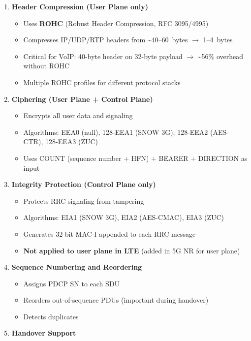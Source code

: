 \begin{enumerate}
\def\labelenumi{\arabic{enumi}.}
\tightlist
\item
  \textbf{Header Compression (User Plane only)}

  \begin{itemize}
  \tightlist
  \item
    Uses \textbf{ROHC} (Robust Header Compression, RFC 3095/\allowbreak{}4995)
  \item
    Compresses IP/\allowbreak{}UDP/\allowbreak{}RTP headers from \textasciitilde{}40–60~bytes \ensuremath{\to} 1–4~bytes
  \item
    Critical for VoIP: 40-byte header on 32-byte payload \ensuremath{\to} \textasciitilde{}56\% overhead without ROHC
  \item
    Multiple ROHC profiles for different protocol stacks
  \end{itemize}
\item
  \textbf{Ciphering (User Plane + Control Plane)}

  \begin{itemize}
  \tightlist
  \item
    Encrypts all user data and signaling
  \item
    Algorithms: EEA0 (null), 128-EEA1 (SNOW 3G), 128-EEA2 (AES-CTR), 128-EEA3 (ZUC)
  \item
    Uses COUNT (sequence number + HFN) + BEARER + DIRECTION as input
  \end{itemize}
\item
  \textbf{Integrity Protection (Control Plane only)}

  \begin{itemize}
  \tightlist
  \item
    Protects RRC signaling from tampering
  \item
    Algorithms: EIA1 (SNOW 3G), EIA2 (AES-CMAC), EIA3 (ZUC)
  \item
    Generates 32-bit MAC-I appended to each RRC message
  \item
    \textbf{Not applied to user plane in LTE} (added in 5G NR for user plane)
  \end{itemize}
\item
  \textbf{Sequence Numbering and Reordering}

  \begin{itemize}
  \tightlist
  \item
    Assigns PDCP SN to each SDU
  \item
    Reorders out-of-sequence PDUs (important during handover)
  \item
    Detects duplicates
  \end{itemize}
\item
  \textbf{Handover Support}


\end{enumerate}
